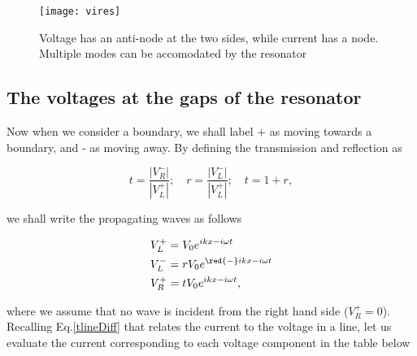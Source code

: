  \begin{figure}
   \texttt{[image: vires]}
   \caption{Voltage has  an anti-node at  the two sides,  while current
     has  a   node.   Multiple   modes  can   be  accomodated   by  the
     resonator\label{tlineVI}}
 \end{figure}

 \subsection{The voltages at the gaps of the resonator}
 Now when we consider a boundary, we  shall label + as moving towards a
 boundary,  and -  as moving  away.  By  defining the  transmission and
 reflection as

 \begin{equation}
   t=\frac{|V_{R}^{-}|}{|V_{L}^{+}|};\quad r=\frac{|V_{L}^{-}|}{|V_{L}^{+}|};\quad t=1+r,
 \end{equation}

 \noindent we shall write the propagating waves as follows

 \begin{align}
   V_L^{+} & = V_0e^{ikx-i\omega t}\\
   V_L^{-} & = rV_0e^{\red{-}ikx-i\omega t}\\
   V_R^{+} & = tV_0e^{ikx-i\omega t},
 \end{align}

 \noindent where we assume that no wave is incident from the right hand
 side ($ V_R^{+}=0 $).  Recalling Eq.\eqref{tlineDiff} that relates the
 current  to  the voltage  in  a  line,  let  us evaluate  the  current
 corresponding to each voltage component in the table below

